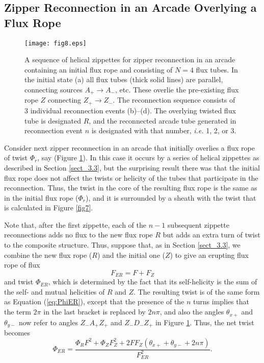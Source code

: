 \documentclass[10pt,namedreferneces]{SolarPhysics}
\begin{document}
\begin{article}
\subsection{\bf Zipper Reconnection in an Arcade Overlying a Flux  Rope}
\label{sect_4.2}

\begin{figure}[h]
{\centering
 \texttt{[image: fig8.eps]}
\caption{A sequence of helical zippettes for zipper reconnection in an arcade containing an initial flux rope and consisting of $N=4$ flux tubes.  In the initial state (a) all flux tubes (thick solid lines) are parallel, connecting sources $A_+\to A_-$, etc.  These overlie the pre-existing flux rope $Z$ connecting $Z_+\to Z_-$. The reconnection sequence consists of 3 individual reconnection events (b)--(d).  The overlying twisted flux tube is designated $R$, and the reconnected arcade tube generated in reconnection event $n$ is designated with that number, \textit{i.e.} 1, 2, or 3.}
\label{fig8}}
\end{figure}

Consider next zipper reconnection in an arcade that initially overlies a flux rope of twist $\Phi_r$, say (Figure \ref{fig8}). In this case it occurs by a series of helical zippettes as described in Section \ref{sect_3.3}, but the surprising result there was that the initial flux rope does not affect the twists or helicity of the tubes that participate in the reconnection. Thus, the twist in the core of the resulting flux rope is the same as in the initial flux rope ($\Phi_r$), and it is surrounded by a sheath with the twist that is calculated in Figure \ref{fig7}.

Note that, after the first zippette, each of the $n-1$ subsequent zippette reconnections adds no flux to the new flux rope $R$ but adds an extra turn of twist
to the composite structure. Thus, suppose that, as in Section \ref{sect_3.3}, we combine the new flux rope ($R$) and the initial one ($Z$) to give an erupting flux rope of flux
\begin{equation}
F_{ER}=F+F_Z
\label{eq_FER}
\end{equation}
and twist $\Phi_{ER}$, which is determined by the fact that its self-helicity is the sum of the self- and mutual helicities of $R$ and $Z$.  The resulting twist is of the same form as Equation (\ref{eq:PhiER}), except that the presence of the $n$ turns implies that the term $2\pi$ in the last bracket is replaced by $2n\pi$, and also the angles $\theta_{x+}$ and $\theta_{y-}$ now refer to angles $Z_-A_+Z_+$ and $Z_-D_-Z_+$ in Figure \ref{fig8}. Thus, the net twist becomes
\begin{equation}
\Phi_{ER}=\frac{\Phi_{R}F^2+\Phi_{Z}F_{Z}^2+2FF_Z(\theta_{x+} + \theta_{y-}+2n\pi)}{F^2_{ER}}.
\label{eq_PhiER}
\end{equation}


\end{article}
\end{document}
